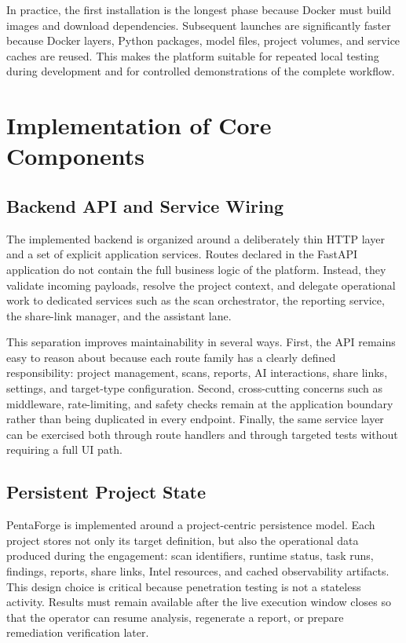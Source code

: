 \documentclass[12pt,a4paper]{report}
\begin{document}
In practice, the first installation is the longest phase because Docker must build
images and download dependencies. Subsequent launches are significantly faster because
Docker layers, Python packages, model files, project volumes, and service caches are
reused. This makes the platform suitable for repeated local testing during development
and for controlled demonstrations of the complete workflow.

\section{Implementation of Core Components}

\subsection{Backend API and Service Wiring}

The implemented backend is organized around a deliberately thin HTTP layer and a set
of explicit application services. Routes declared in the FastAPI application do not
contain the full business logic of the platform. Instead, they validate incoming
payloads, resolve the project context, and delegate operational work to dedicated
services such as the scan orchestrator, the reporting service, the share-link
manager, and the assistant lane.

This separation improves maintainability in several ways. First, the API remains easy
to reason about because each route family has a clearly defined responsibility:
project management, scans, reports, AI interactions, share links, settings, and
target-type configuration. Second, cross-cutting concerns such as middleware,
rate-limiting, and safety checks remain at the application boundary rather than being
duplicated in every endpoint. Finally, the same service layer can be exercised both
through route handlers and through targeted tests without requiring a full UI path.

\subsection{Persistent Project State}

PentaForge is implemented around a project-centric persistence model. Each project
stores not only its target definition, but also the operational data produced during
the engagement: scan identifiers, runtime status, task runs, findings, reports,
share links, Intel resources, and cached observability artifacts. This design choice
is critical because penetration testing is not a stateless activity. Results must
remain available after the live execution window closes so that the operator can
resume analysis, regenerate a report, or prepare remediation verification later.
\end{document}
